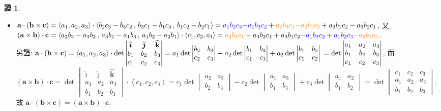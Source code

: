 \documentclass[12pt]{extarticle}
\newcommand{\ds}{\displaystyle}
\newcommand{\llt}{\left\langle}
\newcommand{\rgt}{\right\rangle}
\theoremstyle{definition}
\newtheorem*{prf}{證}
\newcommand{\va}{\mathbf{a}}
\newcommand{\vb}{\mathbf{b}}
\newcommand{\vc}{\mathbf{c}}
\newcommand{\hi}{\widehat{\pmb{\imath}}}
\newcommand{\hj}{\widehat{\pmb{\jmath}}}
\newcommand{\hk}{\widehat{\mathbf{k}}}
\begin{document}
\begin{prf}
\begin{itemize}
    \item $\ds\va\cdot(\vb\times\vc) = \llt a_1,a_2,a_3\rgt\cdot\llt b_2c_3-b_3c_2\,,\, b_3c_1-b_1c_3\,,\, b_1c_2-b_2c_1\rgt = \textcolor{blue}{a_1b_2c_3}\textcolor{blue}{-a_1b_3c_2} + \textcolor{orange}{a_2b_3c_1}\textcolor{orange}{-a_2b_1c_3} + a_3b_1c_2 - a_3b_2c_1$, 又 $\ds(\va\times\vb)\cdot\vc =\llt a_2b_3-a_3b_2\,,\, a_3b_1-a_1b_3\,,\, a_1b_2-a_2b_1\rgt\cdot\llt c_1,c_2,c_3\rgt = \textcolor{orange}{a_2b_3c_1} - a_3b_2c_1 + a_3b_1c_2\textcolor{blue}{-a_1b_3c_2} + \textcolor{blue}{a_1b_2c_3}\textcolor{orange}{-a_2b_1c_3}$. \\另證: $\ds\va\cdot(\vb\times\vc) = \llt a_1,a_2,a_3\rgt\cdot\det\begin{vmatrix}\hi&\hj&\hk\\ b_1&b_2&b_3\\ c_1&c_2&c_3\end{vmatrix} = a_1\det\begin{vmatrix}b_2&b_3\\c_2&c_3\end{vmatrix} - a_2\det\begin{vmatrix}b_1&b_3\\c_1&c_3\end{vmatrix} + a_3\det\begin{vmatrix} b_1&b_2\\c_1&c_2\end{vmatrix} \\ = \det\begin{vmatrix}a_1&a_2&a_3\\b_1&b_2&b_3\\c_1&c_2&c_3\end{vmatrix}$, 而 $\ds(\va\times\vb)\cdot\vc = \det\begin{vmatrix}\hi&\hj&\hk\\a_1&a_2&a_3\\ b_1&b_2&b_3\end{vmatrix}\cdot\llt c_1,c_2,c_3\rgt = c_1\det\begin{vmatrix}a_2&a_3\\ b_2&b_3\end{vmatrix}-c_2\det\begin{vmatrix}a_1&a_3\\ b_1&b_3\end{vmatrix} + c_3\det\begin{vmatrix}a_1&a_2\\b_1&b_2\end{vmatrix} = \det\begin{vmatrix}c_1&c_2&c_3\\a_1&a_2&a_3\\b_1&b_2&b_3\end{vmatrix}$, 故 $\va\cdot(\vb\times\vc) = (\va\times\vb)\cdot\vc$. 

\end{itemize}
\end{prf}
\end{document}
